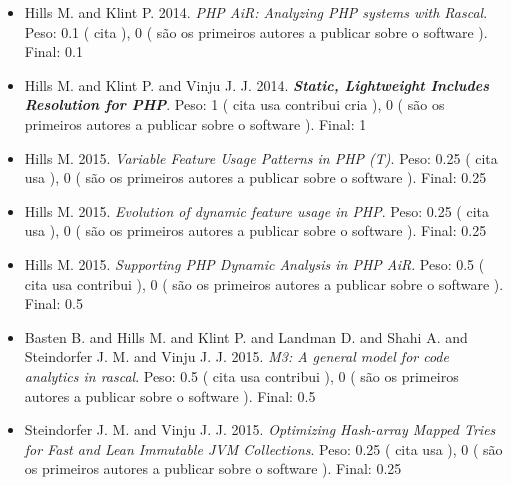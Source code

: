 \begin{itemize}
\item Hills M. and Klint P.
      2014.
        \textit{ PHP AiR: Analyzing PHP systems with Rascal}.
      Peso:
      0.1 (
          cita
      ),
      0 (
são os primeiros autores a publicar sobre o software
      ).
      Final:
      0.1

\item Hills M. and Klint P. and Vinju J. J.
      2014.
        \textbf{\textit{ Static, Lightweight Includes Resolution for PHP}}.
      Peso:
      1 (
          cita
          usa
          contribui
          cria
      ),
      0 (
são os primeiros autores a publicar sobre o software
      ).
      Final:
      1

\item Hills M.
      2015.
        \textit{ Variable Feature Usage Patterns in PHP (T)}.
      Peso:
      0.25 (
          cita
          usa
      ),
      0 (
são os primeiros autores a publicar sobre o software
      ).
      Final:
      0.25

\item Hills M.
      2015.
        \textit{ Evolution of dynamic feature usage in PHP}.
      Peso:
      0.25 (
          cita
          usa
      ),
      0 (
são os primeiros autores a publicar sobre o software
      ).
      Final:
      0.25

\item Hills M.
      2015.
        \textit{ Supporting PHP Dynamic Analysis in PHP AiR}.
      Peso:
      0.5 (
          cita
          usa
          contribui
      ),
      0 (
são os primeiros autores a publicar sobre o software
      ).
      Final:
      0.5

\item Basten B. and Hills M. and Klint P. and Landman D. and Shahi A. and Steindorfer J. M. and Vinju J. J.
      2015.
        \textit{ M3: A general model for code analytics in rascal}.
      Peso:
      0.5 (
          cita
          usa
          contribui
      ),
      0 (
são os primeiros autores a publicar sobre o software
      ).
      Final:
      0.5

\item Steindorfer J. M. and Vinju J. J.
      2015.
        \textit{ Optimizing Hash-array Mapped Tries for Fast and Lean Immutable JVM Collections}.
      Peso:
      0.25 (
          cita
          usa
      ),
      0 (
são os primeiros autores a publicar sobre o software
      ).
      Final:
      0.25


\end{itemize}
